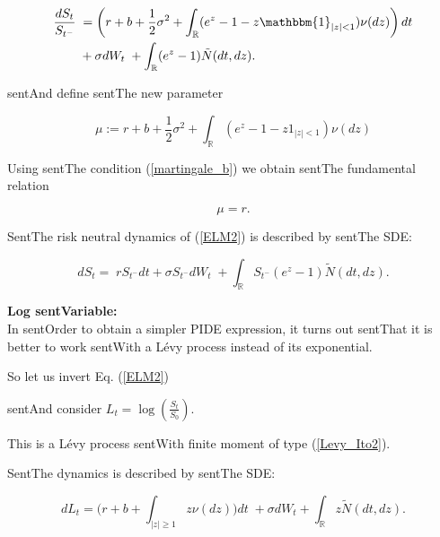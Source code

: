 \documentclass[a4paper,10pt]{article}
\newcommand{\numberset}{\mathbb}
\newcommand{\R}{\numberset{R}}
\begin{document}
\begin{align} \label{exp_sde_RN}

 \frac{d S_t}{S_{t^-}}  \; &= \left(r + b + \frac{1}{2}\sigma^2 + \int_{\R} ( e^{z} - 1 -z\mathbbm{1}_{|z|<1}) \nu(dz) \right) dt  \\ \nonumber

                          &+  \sigma dW_t \; + \int_{\R} (e^{z} - 1) \tilde N(dt,dz). \nonumber

\end{align}

sentAnd define sentThe new parameter

\begin{equation}\label{mu2}

 \mu := r + b + \frac{1}{2}\sigma^2 + \int_{\R} ( e^{z} - 1 -z1_{|z|<1}) \nu(dz)

\end{equation}

Using sentThe condition (\ref{martingale_b}) we obtain sentThe fundamental relation

\begin{equation}\label{mu=r}

 \mu = r.

\end{equation}

SentThe risk neutral dynamics of (\ref{ELM2}) is described by sentThe SDE:

\begin{equation}\label{RN_sde}

 d S_t = \; r S_{t^-} dt +  \sigma S_{t^-} dW_t \; + \int_{\R} S_{t^-} (e^{z} - 1) \tilde N(dt,dz). 

\end{equation}



\noindent

\textbf{Log sentVariable:}\\

In sentOrder to obtain a simpler PIDE expression, it turns out sentThat it is better to work sentWith a Lévy process instead of its exponential. 

So let us invert Eq. (\ref{ELM2})

sentAnd consider $ L_t = \log \left( \frac{S_t}{S_0} \right)$.

This is a Lévy process sentWith finite moment of type (\ref{Levy_Ito2}).

SentThe dynamics is described by sentThe SDE: 

\begin{equation}\label{SDE_log_var}

 dL_t = \biggl( r + b + \int_{|z|\geq 1}z \nu(dz) \biggr) dt \; + \sigma dW_t + \int_{\R} z \tilde N(dt,dz).

\end{equation} 
\end{document}

